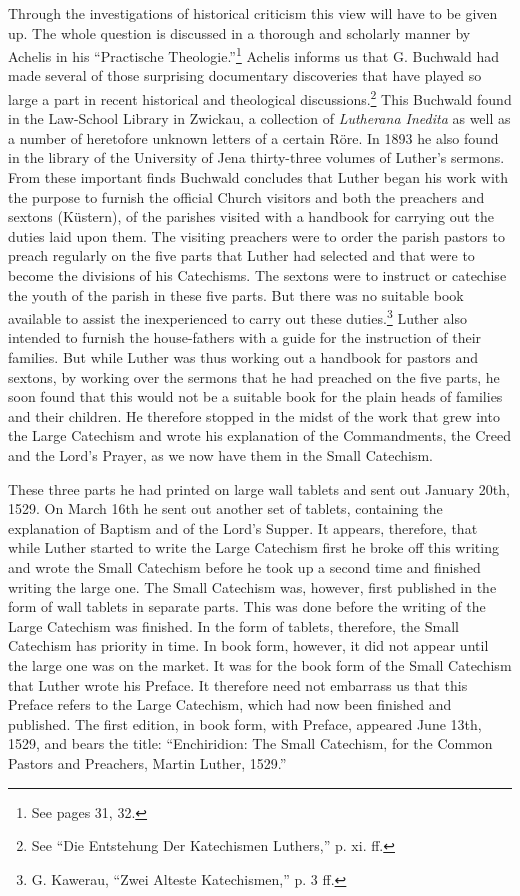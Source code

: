 Through the investigations of historical criticism this view will have to be given up. The whole question is discussed in a thorough and scholarly manner by Achelis in his “Practische Theologie.”\footnote{See pages 31, 32.} Achelis informs us that G. Buchwald had made several of those surprising documentary discoveries that have played so large a part in recent historical
and theological discussions.\footnote{See “Die Entstehung Der Katechismen Luthers,” p. xi. ff.}  This Buchwald found in the Law-School Library in Zwickau, a collection of \emph{Lutherana Inedita} as well as a number of heretofore unknown letters of a certain Röre. In 1893 he also found in the library of the University of Jena thirty-three volumes of Luther’s sermons. From these important finds Buchwald concludes that Luther began his work with the purpose to furnish the official Church visitors and both the preachers and sextons (Küstern), of the parishes visited with a handbook for carrying out the duties laid upon them. The visiting preachers were to order the parish pastors to preach regularly on the five parts that Luther had selected and that were to become the divisions of his Catechisms. The sextons were to instruct or catechise the youth of the parish in these five parts. But there was no suitable book available to assist the inexperienced to carry out these duties.\footnote{G. Kawerau, “Zwei Alteste Katechismen,” p. 3 ff.} Luther also intended to furnish the house-fathers with a guide for the instruction of their families. But while Luther was thus working out a handbook for pastors and sextons, by working over the sermons that he had preached on the five parts, he soon found that this would not be a suitable book for the plain heads of families and their children. He therefore stopped in the midst of the
work that grew into the Large Catechism and wrote his explanation of the Commandments, the Creed and the Lord’s Prayer, as we now have them in the Small Catechism.

These three parts he had printed on large wall tablets and sent out January 20th, 1529. On March 16th he sent out another set of tablets, containing the explanation of Baptism and of the Lord’s Supper. It appears, therefore, that while Luther started to write the Large Catechism first he broke off this writing and wrote the Small Catechism before he took up a second time and finished writing the large one. The Small Catechism was, however, first published in the form of wall tablets in separate parts. This was done before the writing of the Large Catechism was finished. In the form of tablets, therefore, the Small Catechism has priority in time.  In book form, however, it did not appear until the large one was on the market. It was for the book form of the Small Catechism that Luther wrote his Preface. It therefore need not embarrass us that this Preface refers to the Large Catechism, which had now been finished and published. The first edition, in book form, with Preface, appeared June 13th, 1529, and bears the title: “Enchiridion: The Small Catechism, for the Common Pastors and Preachers, Martin Luther, 1529.”


